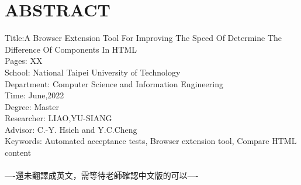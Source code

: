 \chapter*{ABSTRACT}


\noindent
Title:A Browser Extension Tool For Improving The Speed Of Determine The Difference Of Components In HTML\\
Pages: XX\\  %
School: National Taipei University of Technology\\
Department: Computer Science and Information Engineering\\
Time: June,2022\\
Degree: Master\\
Researcher: LIAO,YU-SIANG\\
Advisor: C.-Y. Hsieh and Y.C.Cheng %
\hspace*{\fill}\\
Keywords: Automated acceptance tests, Browser extension tool, Compare HTML content \\
\hspace*{\fill}\\
\indent %
----還未翻譯成英文，需等待老師確認中文版的可以----